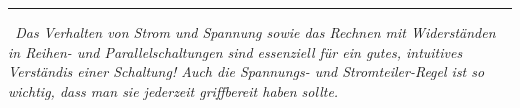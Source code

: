 \documentclass{article}
\begin{document}
\begin{mdframed}
{\begin{minipage}{0.475\textwidth}
\scalebox{0.98}{\begin{minipage}{\textwidth}\[\small\frac{\text{Teilspannung}}{\text{Gesamtspannung}} = \frac{\text{Widerstand unter Teilspannungsabfall}}{\text{Gesamtwiderstand}}\]\end{minipage}}
\end{minipage}}%
\hspace{0.1\baselineskip}

\vspace{0.5\baselineskip}
\rule{0.6\textwidth}{0.5pt}
\begin{minipage}{0.8\textwidth}
\vspace{0.5\baselineskip}
\textit{\small\ Das Verhalten von Strom und Spannung sowie das Rechnen mit Widerständen in Reihen- und Parallelschaltungen sind essenziell für ein gutes, intuitives Verständis einer Schaltung! Auch die Spannungs- und Stromteiler-Regel ist so wichtig, dass man sie jederzeit griffbereit haben sollte.}
\end{minipage}
\vspace{0.3\baselineskip}
\end{mdframed}
\vspace{0.8\baselineskip}
\end{document}
